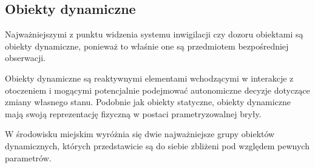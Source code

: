 {\subsection{Obiekty dynamiczne}
\par{
Najważniejszymi z punktu widzenia systemu inwigilacji czy dozoru obiektami są obiekty dynamiczne, ponieważ to właśnie one są przedmiotem bezpośredniej obserwacji.
}
\par{
Obiekty dynamiczne są reaktywnymi elementami wchodzącymi w interakcje z otoczeniem i mogącymi potencjalnie podejmować autonomiczne decyzje dotyczące zmiany własnego stanu. Podobnie jak obiekty statyczne, obiekty dynamiczne mają swoją reprezentację fizyczną w postaci prametryzowalnej bryły.
}
\par{
W środowisku miejskim wyróżnia się dwie najważniejsze grupy obiektów dynamicznych, których przedstawicie są do siebie zbliżeni pod względem pewnych parametrów.
}
}
